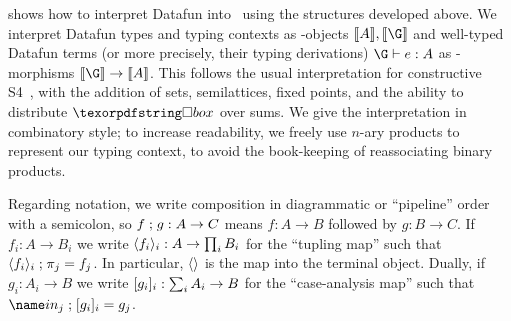 

 shows how to interpret Datafun into \Poset\ using the
structures developed above.
%
We interpret Datafun types and typing contexts as \Poset-objects $\den{A},
\den{\G}$ and well-typed Datafun terms (or more precisely, their typing
derivations) $\J e \G A$ as \Poset-morphisms $\den{\G} \to \den A$.
%
This follows the usual interpretation for constructive S4~\citep{depaiva-s4},
with the addition of sets, semilattices, fixed points, and the ability to
distribute $\iso$ over sums.
%
We give the interpretation in combinatory style; to increase readability, we
freely use $n$-ary products to represent our typing context, to avoid the
book-keeping of reassociating binary products.

Regarding notation, we write composition in diagrammatic or ``pipeline'' order
with a semicolon, so $f \mathrel{;} g : A \to C$ means $f : A \to B$ followed by $g
: B \to C$.
%
If $f_i : A \to B_i$ we write $\langle{f_i}\rangle_i : A \to \prod_i B_i$ for the
``tupling map'' such that $\langle{f_i}\rangle_i \mathrel{;} \pi_j = f_j$.
%
In particular, $\langle{}\rangle$ is the map into the terminal object.
%
Dually, if $g_i : A_i \to B$ we write $[{g_i}]_i : \sum_i A_i \to B$ for the
``case-analysis map'' such that $\injc_j \then \krof{g_i}_i = g_j$.

